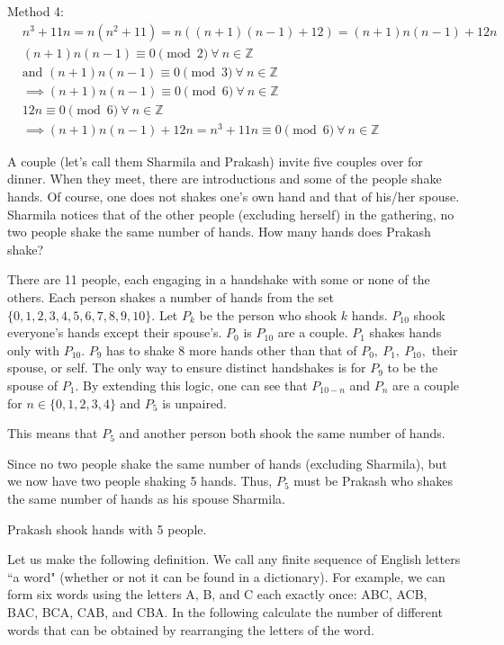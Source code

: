 \documentclass[12pt,answers]{exam}
\begin{document}
\begin{questions}
\begin{solution}
        Method 4:
        \[
            \begin{aligned}
        &n^3+11n = n(n^2 + 11) = n((n+1)(n-1)+12)= (n+1)n(n-1) + 12n\\
        &(n+1)n(n-1) \equiv 0 \pmod{2}\ \forall\ n \in \mathbb{Z}\\
        &\text{and } (n+1)n(n-1) \equiv 0 \pmod{3}\ \forall\ n \in \mathbb{Z}\\
        &\implies (n+1)n(n-1) \equiv 0 \pmod{6}\ \forall\ n \in \mathbb{Z}\\
        &12n \equiv 0 \pmod{6}\ \forall\ n \in \mathbb{Z}\\
        &\implies (n+1)n(n-1) + 12n = n^3+11n \equiv 0 \pmod{6}\ \forall\ n \in \mathbb{Z}
            \end{aligned}
            \]
\end{solution}
\question A couple (let's call them Sharmila and Prakash) invite five couples over for dinner. When they meet, there are introductions and some of the people shake hands. Of course, one does not shakes one's own hand and that of his/her spouse. Sharmila notices that of the other people (excluding herself) in the gathering, no two people shake the same number of hands. How many hands does Prakash shake?
\begin{solution}
    There are 11 people, each engaging in a handshake with some or none of the others. Each person shakes a number of hands from the set \(\{0,1,2,3,4,5,6,7,8,9,10\}\). Let $P_k$ be the person who shook $k$ hands. $P_{10}$ shook everyone's hands except their spouse's. $P_0$ is $P_{10}$ are a couple. $P_1$ shakes hands only with $P_10$. $P_{9}$ has to shake 8 more hands other than that of $P_0,\ P_1,\ P_{10},$ their spouse, or self. The only way to ensure distinct handshakes is for $P_9$ to be the spouse of $P_1$.
    By extending this logic, one can see that $P_{10-n}$ and $P_n$ are a couple for \(n\in\{0,1,2,3,4\}\) and $P_5$ is unpaired. 

    This means that $P_5$ and another person both shook the same number of hands. 
    
    Since no two people shake the same number of hands (excluding Sharmila), but we now have two people shaking 5 hands. Thus, $P_5$ must be Prakash who shakes the same number of hands as his spouse Sharmila.

    Prakash shook hands with 5 people. 
\end{solution}
\question Let us make the following definition. We call any finite sequence of English letters ``a word" (whether or not it can be found in a dictionary). For example, we can form six words using the letters A, B, and C each exactly once: ABC, ACB, BAC, BCA, CAB, and CBA. In the following calculate the number of different words that can be obtained by rearranging the letters of the word.
\begin{parts}

\end{parts}
\end{questions}
\end{document}
